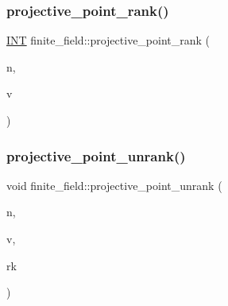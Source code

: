 \mbox{\label{classfinite__field_a90a6080ee8a8065ad462f6716f6af3d9}} 
\subsubsection{\texorpdfstring{projective\+\_\+point\+\_\+rank()}{projective\_point\_rank()}}
{\footnotesize\ttfamily \mbox{\hyperlink{galois_8h_a09fddde158a3a20bd2dcadb609de11dc}{I\+NT}} finite\+\_\+field\+::projective\+\_\+point\+\_\+rank (\begin{DoxyParamCaption}\item[{\mbox{\hyperlink{galois_8h_a09fddde158a3a20bd2dcadb609de11dc}{I\+NT}}}]{n,  }\item[{\mbox{\hyperlink{galois_8h_a09fddde158a3a20bd2dcadb609de11dc}{I\+NT}} $\ast$}]{v }\end{DoxyParamCaption})}

\mbox{\label{classfinite__field_af1bce562f90c3dc58447ab35f4f44883}} 
\subsubsection{\texorpdfstring{projective\+\_\+point\+\_\+unrank()}{projective\_point\_unrank()}}
{\footnotesize\ttfamily void finite\+\_\+field\+::projective\+\_\+point\+\_\+unrank (\begin{DoxyParamCaption}\item[{\mbox{\hyperlink{galois_8h_a09fddde158a3a20bd2dcadb609de11dc}{I\+NT}}}]{n,  }\item[{\mbox{\hyperlink{galois_8h_a09fddde158a3a20bd2dcadb609de11dc}{I\+NT}} $\ast$}]{v,  }\item[{\mbox{\hyperlink{galois_8h_a09fddde158a3a20bd2dcadb609de11dc}{I\+NT}}}]{rk }\end{DoxyParamCaption})}

\mbox{\label{classfinite__field_ab464884f869dda29daa1fe9c2a4c0594}} 
